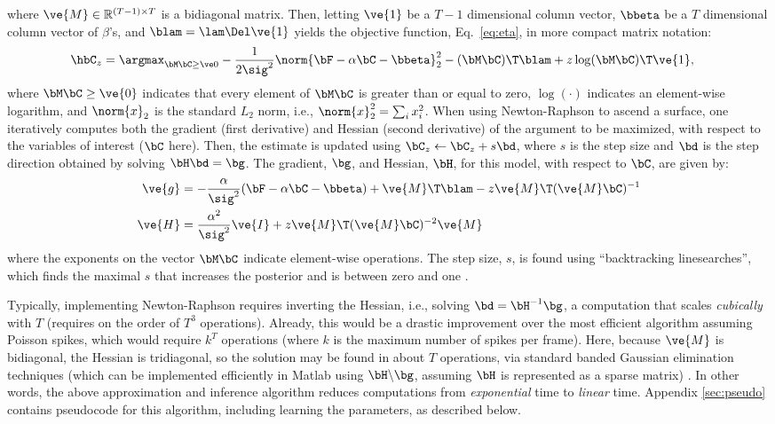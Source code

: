 \noindent where $\ve{M} \in \mathbb{R}^{(T-1) \times T}$ is a bidiagonal matrix.  Then, letting $\ve{1}$ be a $T-1$ dimensional column vector, $\bbeta$ be a $T$ dimensional column vector of $\beta$'s, and $\blam=\lam \Del \ve{1}$ yields the objective function, Eq.~\eqref{eq:eta}, in more compact matrix notation:
\begin{align} 
\hbC_{\zzz} 
&= \az  -\frac{1}{2 \sig^2} \norm{\bF - \alpha \bC -\bbeta}_2^2 - (\bM \bC )\T \blam  + \zzz \log(\bM \bC)\T\ve{1},  \label{eq:eta3}
\end{align}
\noindent where $\bM \bC \geq \ve{0}$ indicates that every element of $\bM \bC$ is greater than or equal to zero, $\log(\cdot)$ indicates an element-wise logarithm, and $\norm{x}_2$ is the standard $L_2$ norm, i.e., $\norm{x}_2^2=\sum_i x_i^2$. When using Newton-Raphson to ascend a surface, one iteratively computes both the gradient (first derivative) and Hessian (second derivative) of the argument to be maximized, with respect to the variables of interest ($\bC$ here).  Then, the estimate is updated using $\bC_z \leftarrow \bC_z + s \bd$, where $s$ is the step size and $\bd$ is the step direction obtained by solving $\bH \bd = \bg$.  The gradient, $\bg$, and Hessian, $\bH$, for this model, with respect to $\bC$, are given by:
\begin{subequations} \label{eq:NR}
\begin{align}
\ve{g} &= -\frac{\alpha}{\sig^2}(\bF -\alpha \bC - \bbeta) + \ve{M}\T\blam - \zzz \ve{M}\T (\ve{M} \bC)^{-1} \label{eq:g} \\
\ve{H} &= \frac{\alpha^2}{\sig^2} \ve{I} + \zzz \ve{M}\T (\ve{M} \bC)^{-2} \ve{M} \label{eq:H}
\end{align}
\end{subequations}
\noindent where the exponents on the vector $\bM \bC$ indicate element-wise operations. The step size, $s$, is found using ``backtracking linesearches'', which finds the maximal $s$ that increases the posterior and is between zero and one \cite{Press92}.

Typically, implementing Newton-Raphson requires inverting the Hessian, i.e.,  solving $\bd = \bH^{-1} \bg$, a computation that scales \emph{cubically} with $T$ (requires on the order of $T^3$ operations). Already, this would be a drastic improvement over the most efficient algorithm assuming Poisson spikes, which would require $k^T$ operations (where $k$ is the maximum number of spikes per frame).  Here, because $\ve{M}$ is bidiagonal, the Hessian is tridiagonal, so the solution may be found in about $T$ operations, via standard banded Gaussian elimination techniques (which can be implemented efficiently in Matlab using $\bH \backslash \bg$, assuming $\bH$ is represented as a sparse matrix) \cite{PaninskiWu09}. In other words, the above approximation and inference algorithm reduces computations from \emph{exponential} time to \emph{linear} time.  Appendix \ref{sec:pseudo} contains pseudocode for this algorithm, including learning the parameters, as described below.





